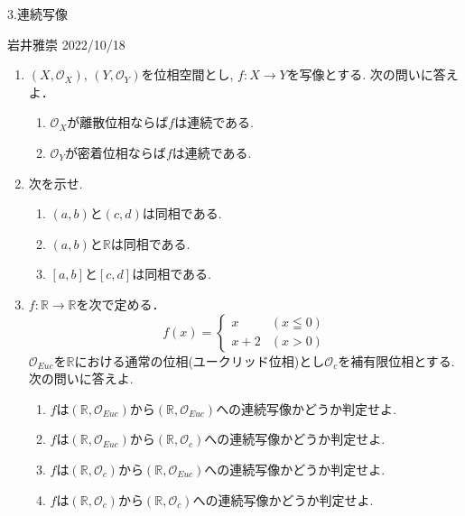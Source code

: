 \documentclass[dvipdfmx,a4paper,11pt]{article}
\newcommand{\R}{\mathbb{R}}
\theoremstyle{definition}
\begin{document}


\begin{center}
{\Large 3.連続写像}
\end{center}

\begin{flushright}
 岩井雅崇 2022/10/18
\end{flushright}

\begin{enumerate}[ label=\textbf{問}3.\arabic*]

\item $(X, \mathscr{O}_X )$, $(Y, \mathscr{O}_Y)$を位相空間とし, $f : X \rightarrow Y$を写像とする. 次の問いに答えよ．
	\begin{enumerate}
	\item $\mathscr{O}_X $が離散位相ならば$f$は連続である.
	\item $\mathscr{O}_Y $が密着位相ならば$f$は連続である.
	\end{enumerate}

\item 次を示せ.
 	\begin{enumerate}
	\item $(a,b)$と$(c,d)$は同相である.  
	\item $(a,b)$と$\R$は同相である. 
	\item $[a,b]$と$[c,d]$は同相である. 
	\end{enumerate}	
	
\item $f : \R \rightarrow \R$を次で定める．
   $$
  f(x)= \begin{cases}
     x& (x \leqq 0) \\
    x+2& (x >0)
  \end{cases}
  $$
  $\mathscr{O}_{Euc}$を$\R$における通常の位相(ユークリッド位相)とし$\mathscr{O}_c$を補有限位相とする. 次の問いに答えよ.
 	\begin{enumerate}
	\item $f $は$(\R, \mathscr{O}_{Euc})$から$(\R, \mathscr{O}_{Euc})$への連続写像かどうか判定せよ.
	\item $f $は$(\R, \mathscr{O}_{Euc})$から$(\R, \mathscr{O}_c)$への連続写像かどうか判定せよ.
	\item $f $は$(\R, \mathscr{O}_c)$から$(\R, \mathscr{O}_{Euc})$への連続写像かどうか判定せよ.
	\item $f $は$(\R, \mathscr{O}_c)$から$(\R, \mathscr{O}_c)$への連続写像かどうか判定せよ.
	\end{enumerate}


\end{enumerate}
\end{document}
